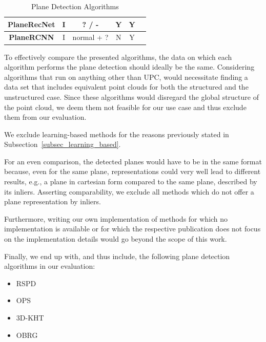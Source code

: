\documentclass[main.tex]{subfiles}
\begin{document}
\begin{table}[H]
\begin{tabular}{|c|c|c|c|c|c}
        \textbf{PlaneRecNet} \cite{Xie_Shu_Rambach_Pagani_Stricker_2022} & I                   & ? / -                 & Y                       & Y                     \\ \hline
        \textbf{PlaneRCNN} \cite{Liu_Kim_Gu_Furukawa_Kautz_2019}         & I                   & normal + ?            & N                       & Y                     \\ \hline
    \end{tabular}
    \caption{Plane Detection Algorithms}
    \label{tab:algos}
\end{table}

To effectively compare the presented algorithms, the data on which each algorithm performs the plane detection should ideally be the same.
Considering algorithms that run on anything other than UPC, would necessitate finding a data set that includes equivalent point clouds for both the structured and the unstructured case.
Since these algorithms would disregard the global structure of the point cloud, we deem them not feasible for our use case and thus exclude them from our evaluation.

We exclude learning-based methods for the reasons previously stated in Subsection~\ref{subsec_learning_based}.

For an even comparison, the detected planes would have to be in the same format because, even for the same plane, representations could very well lead to different results, e.g., a plane in cartesian form compared to the same plane, described by its inliers.
Asserting comparability, we exclude all methods which do not offer a plane representation by inliers.

Furthermore, writing our own implementation of methods for which no implementation is available or for which the respective publication does not focus on the implementation details would go beyond the scope of this work.

Finally, we end up with, and thus include, the following plane detection algorithms in our evaluation:

\begin{itemize}
    \item RSPD
    \item OPS
    \item 3D-KHT
    \item OBRG
\end{itemize}
\end{document}

